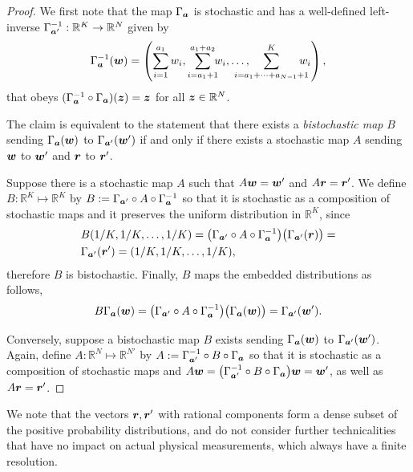\documentclass[pra,
aps,
twocolumn,
superscriptaddress,
groupedaddress,
nofootinbib,
reprint
]{revtex4-1}
\begin{document}
\begin{proof}
	We first note that the map $\Gamma_{\bm{a}}$ is stochastic and has a well-defined left-inverse $\Gamma^{-1}_{\bm{a}'}: \mathbb{R}^K \rightarrow \mathbb{R}^N$ given by
\begin{equation}
	\Gamma^{-1}_{\bma}(\w) = \left( \sum_{i=1}^{a_1} w_i,  \sum_{i = a_1 +1}^{a_1 + a_2} \hspace{-5pt} w_i, \dots , \hspace{-15pt} \sum_{i=a_1 + \dots + a_{N-1}+1}^{K} \hspace{-10pt} w_i \right),
\end{equation}
that obeys $(\Gamma^{-1}_{\bm{a}} \circ \Gamma_{\bm{a}}) (\bm{z}) = \bm{z}$ for all $\bm{z} \in \mathbb{R}^N$. 

The claim is equivalent to the statement that there exists a \emph{bistochastic map} $B$ sending $\Gamma_{\bm{a}}(\boldsymbol{w})$ to $\Gamma_{\bm{a}'}(\boldsymbol{w}')$ if and only if there exists a stochastic map $A$ sending $\boldsymbol{w}$ to $\boldsymbol{w}'$ and $\boldsymbol{r}$ to $\boldsymbol{r}'$.

Suppose there is a stochastic map $A$ such that $A\boldsymbol{w}=\boldsymbol{w}'$ and $A\boldsymbol{r} = \boldsymbol{r}'$. 
We define $B:\mathbb{R}^K \mapsto \mathbb{R}^K$ by $B := \Gamma_{\bm{a}'} \circ A \circ \Gamma_{\bm{a}}^{-1}$ so that it is stochastic as a composition of stochastic maps and it preserves the uniform distribution in $\mathbb{R}^K$, since
\begin{align}
	&B(1/K, 1/K, \dots, 1/K) = \big( \Gamma_{\bm{a}'} \circ A \circ \Gamma_{\bm{a}}^{-1} \big) \big( \Gamma_{\bm{a}'}(\boldsymbol{r}) \big) = \nonumber\\
	&\Gamma_{\bm{a}'} (\boldsymbol{r}') = (1/K, 1/K, \dots, 1/K),
\end{align}
therefore $B$ is bistochastic.
Finally, $B$ maps the embedded distributions as follows,
\begin{equation}
	B \Gamma_{\bm{a}}(\boldsymbol{w}) = \big( \Gamma_{\bm{a}'} \circ A \circ \Gamma_{\bm{a}}^{-1} \big) \big( \Gamma_{\bm{a}}(\boldsymbol{w}) \big) = \Gamma_{\bm{a}'} (\boldsymbol{w}').
\end{equation}

Conversely, suppose a bistochastic map $B$ exists sending $\Gamma_{\bm{a}}(\boldsymbol{w})$ to $\Gamma_{\bm{a}'}(\boldsymbol{w}')$. Again, define $A: \mathbb{R}^N \mapsto \mathbb{R}^{N'}$ by $A := \Gamma_{\bm{a}'}^{-1} \circ B \circ \Gamma_{\bm{a}}$ so that it is stochastic as a composition of stochastic maps and $A \boldsymbol{w} = \big( \Gamma_{\bm{a}'}^{-1} \circ B \circ \Gamma_{\bm{a}} \big) \boldsymbol{w} = \boldsymbol{w}'$, as well as $A \boldsymbol{r} = \boldsymbol{r}'$.
\end{proof}
We note that the vectors $\boldsymbol{r}, \boldsymbol{r}'$ with rational components form a dense subset of the positive probability distributions, and do not consider further technicalities that have no impact on actual physical measurements, which always have a finite resolution.
\end{document}
